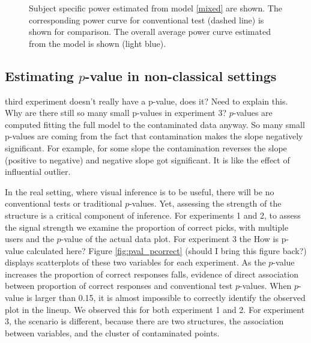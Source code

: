 \documentclass{article}
\newcommand{\blue}[1]{{\color{blue} #1}} %
\newcommand{\green}[1]{{\color{green} #1}} %
\begin{document}
\begin{figure}[hbtp]
   \centering
       \caption{Subject specific  power estimated from model \ref{mixed} are shown. The corresponding power curve for conventional test (dashed line) is shown for comparison. The overall average power curve estimated from the model is shown (light blue).}
       \label{fig:power_mixed_subject}
\end{figure}


\subsection{Estimating $p$-value in non-classical settings} 

\green{third experiment doesn't really have a p-value, does it? Need to explain this. Why are there still so many small p-values in experiment 3?} \blue{$p$-values are computed fitting the full model to the contaminated data anyway. So many small p-values are coming from the fact that contamination makes the slope negatively significant. For example, for some slope the contamination reverses the slope (positive to negative) and negative slope got significant. It is like the effect of influential outlier.}

In the real setting, where visual inference is to be useful, there will be no conventional tests or traditional $p$-values. Yet, assessing the strength of the structure is a critical component of inference. For experiments 1 and 2, to assess the signal strength we examine the proportion of correct picks, with multiple users and the $p$-value of the actual data plot. For experiment 3 the \green{How is p-value calculated here?} Figure \ref{fig:pval_pcorrect} \blue{(should I bring this figure back?)}  displays scatterplots of these two variables for each experiment. As the $p$-value increases the proportion of correct responses falls, evidence of direct association between proportion of correct responses and conventional test $p$-values. When $p$-value is larger than 0.15, it is almost impossible to correctly identify the observed plot in the lineup. We observed this for both experiment 1 and 2. For experiment 3, the scenario is different, because there are two structures, the association between variables, and the cluster of contaminated points.%
\end{document}
